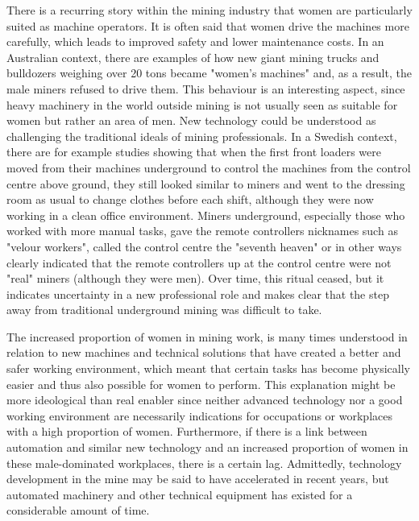 \documentclass[
  12pt,
]{scrbook}
\begin{document}
There is a recurring story within the mining industry that women are particularly suited as machine operators. It is often said that women drive the machines more carefully, which leads to improved safety and lower maintenance costs. In an Australian context, there are examples of how new giant mining trucks and bulldozers weighing over 20 tons became "women's machines" and, as a result, the male miners refused to drive them. This behaviour is an interesting aspect, since heavy machinery in the world outside mining is not usually seen as suitable for women but rather an area of men. New technology could be understood as challenging the traditional ideals of mining professionals. In a Swedish context, there are for example studies showing that when the first front loaders were moved from their machines underground to control the machines from the control centre above ground, they still looked similar to miners and went to the dressing room as usual to change clothes before each shift, although they were now working in a clean office environment. Miners underground, especially those who worked with more manual tasks, gave the remote controllers nicknames such as "velour workers", called the control centre the "seventh heaven" or in other ways clearly indicated that the remote controllers up at the control centre were not "real" miners (although they were men). Over time, this ritual ceased, but it indicates uncertainty in a new professional role and makes clear that the step away from traditional underground mining was difficult to take.

The increased proportion of women in mining work, is many times understood in relation to new machines and technical solutions that have created a better and safer working environment, which meant that certain tasks has become physically easier and thus also possible for women to perform. This explanation might be more ideological than real enabler since neither advanced technology nor a good working environment are necessarily indications for occupations or workplaces with a high proportion of women. Furthermore, if there is a link between automation and similar new technology and an increased proportion of women in these male-dominated workplaces, there is a certain lag. Admittedly, technology development in the mine may be said to have accelerated in recent years, but automated machinery and other technical equipment has existed for a considerable amount of time.
\end{document}
